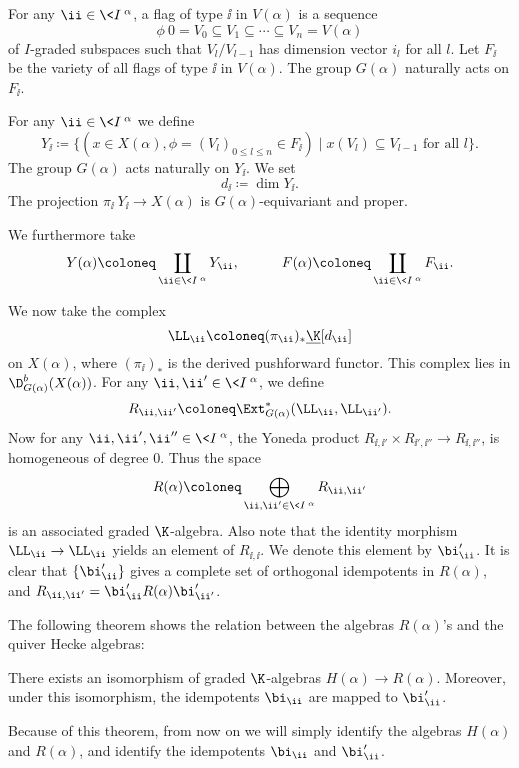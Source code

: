 For any $\ii\in\<I\>^\alpha$, a flag of type $\ii$ in $V(\alpha)$ 
is a sequence 
\[
    \phi\:0 = V_0\subseteq V_1\subseteq\cdots
    \subseteq V_n = V(\alpha)
\] 
of $I$-graded subspaces such that
$V_l/V_{l-1}$ has dimension vector $i_l$ for all $l$.
Let $F_{\ii}$ be the variety of all flags of type $\ii$ in
$V(\alpha)$. The group $G(\alpha)$ naturally acts on $F_{\ii}$.

For any $\ii\in\<I\>^\alpha$
we define 
\[
    Y_{\ii} \coloneq  \{(x\in X(\alpha),\phi = (V_l)_{0\le l\le n}\in F_{\ii})\mid
    x(V_l)\subseteq V_{l-1}\text{ for all }l\}.
\] 
The group $G(\alpha)$ 
acts naturally on $Y_{\ii}$. We set 
\[
    d_{\ii} \coloneq  \dim Y_{\ii}.
\]
The projection $\pi_{\ii}\:Y_{\ii}
\to X(\alpha)$ is $G(\alpha)$-equivariant and proper.

We furthermore take 
\[
    Y(\alpha) \coloneq  \coprod_{\ii\in\<I\>^\alpha}Y_{\ii},
    \hspace{3em}F(\alpha) \coloneq  \coprod_{\ii\in\<I\>^\alpha}F_{\ii}.
\]    

We now take the complex 
\[
    \LL_{\ii} \coloneq  (\pi_{\ii})_*\underline{\K}[d_{\ii}]
\]    
on $X(\alpha)$, where $(\pi_{\ii})_*$ is the derived pushforward 
functor. This complex lies in $\D_{G(\alpha)}^b(X(\alpha))$.
For any $\ii,\ii'\in\<I\>^\alpha$, we define $$R_{\ii,\ii'}
 \coloneq  \Ext^*_{G(\alpha)}(\LL_{\ii},\LL_{\ii'}).$$ Now for any 
$\ii,\ii',\ii''\in\<I\>^\alpha$, the Yoneda
product $R_{\ii,\ii'}\times R_{\ii',\ii''}\to R_{\ii,\ii''}$,
is homogeneous of degree $0$. Thus the space
\[
    R(\alpha) \coloneq  \bigoplus_{\ii,\ii'\in\<I\>^\alpha}R_{\ii,\ii'}
\]    
is an associated graded $\K$-algebra. Also note that 
the identity morphism $\LL_{\ii}\to\LL_{\ii}$ yields 
an element of $R_{\ii,\ii}$. We denote this element by $\bi_{\ii}'$.
It is clear that $\{\bi_{\ii}'\}$ gives a complete set of
orthogonal idempotents in $R(\alpha)$, and $R_{\ii,\ii'}
 = \bi_{\ii}'R(\alpha)\bi_{\ii'}'$.

The following theorem shows the relation between the 
algebras $R(\alpha)$'s and the quiver Hecke algebras:

\begin{theorem}\label{geo-real}
    There exists an isomorphism of graded $\K$-algebras
    $H(\alpha)\to R(\alpha)$. Moreover, under this isomorphism,
    the idempotents $\bi_{\ii}$ are mapped to $\bi_{\ii}'$.
\end{theorem}

Because of this theorem, from now on we will simply identify
the algebras $H(\alpha)$ and $R(\alpha)$, and identify the 
idempotents $\bi_{\ii}$ and $\bi_{\ii}'$.


